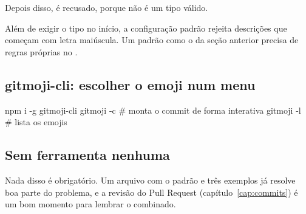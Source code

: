 Depois disso,  é recusado, porque  não é um tipo válido.

\begin{aviso}
Além de exigir o tipo no início, a configuração padrão rejeita descrições que começam com letra maiúscula. Um padrão como o da seção anterior precisa de regras próprias no .
\end{aviso}

\subsection*{gitmoji-cli: escolher o emoji num menu}

\begin{bashcode}
npm i -g gitmoji-cli
gitmoji -c        # monta o commit de forma interativa
gitmoji -l        # lista os emojis
\end{bashcode}

\subsection*{Sem ferramenta nenhuma}

Nada disso é obrigatório. Um arquivo  com o padrão e três exemplos já resolve boa parte do problema, e a revisão do Pull Request (capítulo~\ref{cap:commits}) é um bom momento para lembrar o combinado.
